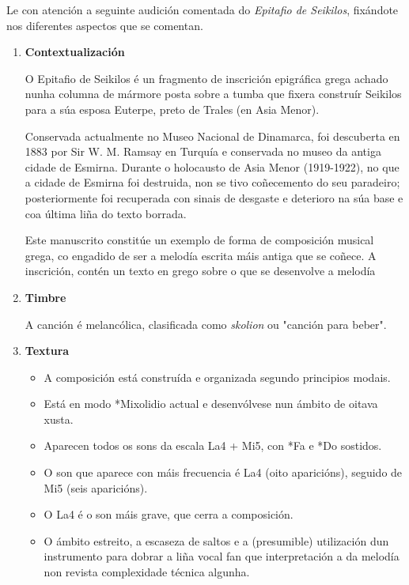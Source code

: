 \begin{ejercicio}
Le con atención a seguinte audición comentada do \textit{Epitafio de Seikilos}, fixándote nos diferentes aspectos que se comentan.
%
   \begin{enumerate}[1.-]

       \item \textbf{Contextualización}
       \par
O Epitafio de Seikilos é un fragmento de inscrición epigráfica grega achado nunha columna de mármore posta sobre a tumba que fixera construír Seikilos para a súa esposa Euterpe, preto de Trales (en Asia Menor).
\par
Conservada actualmente no Museo Nacional de Dinamarca, foi descuberta en 1883 por Sir W. M. Ramsay en Turquía e conservada no museo da antiga cidade de Esmirna. Durante o holocausto de Asia Menor (1919-1922), no que a cidade de Esmirna foi destruida, non se tivo coñecemento do seu paradeiro; posteriormente foi recuperada con sinais de desgaste e deterioro na súa base e coa última liña do texto borrada.
\par
Este manuscrito constitúe un exemplo de forma de composición musical grega, co engadido de ser a melodía escrita máis antiga que se coñece. A inscrición, contén un texto en grego sobre o que se desenvolve a melodía

   \item \textbf{Timbre} \par
A canción é melancólica, clasificada como \textit{skolion} ou "canción para beber".

    \item \textbf{Textura} \par
    \begin{itemize}
        \item 
        A composición está construída e organizada segundo principios modais.
        \item 
        Está en modo *Mixolidio actual e desenvólvese nun ámbito de oitava xusta. 
        \item
        Aparecen todos os sons da escala La4 + Mi5, con *Fa e *Do sostidos.
        \item
        O son que aparece con máis frecuencia é La4 (oito aparicións), seguido de Mi5 (seis aparicións). 
        \item
        O La4 é o son máis grave, que cerra a composición. 
        \item 
        O ámbito estreito, a escaseza de saltos e a (presumible) utilización dun instrumento para dobrar a liña vocal fan que interpretación a da melodía non revista complexidade técnica algunha.
    \end{itemize}


\end{enumerate}
\end{ejercicio}
